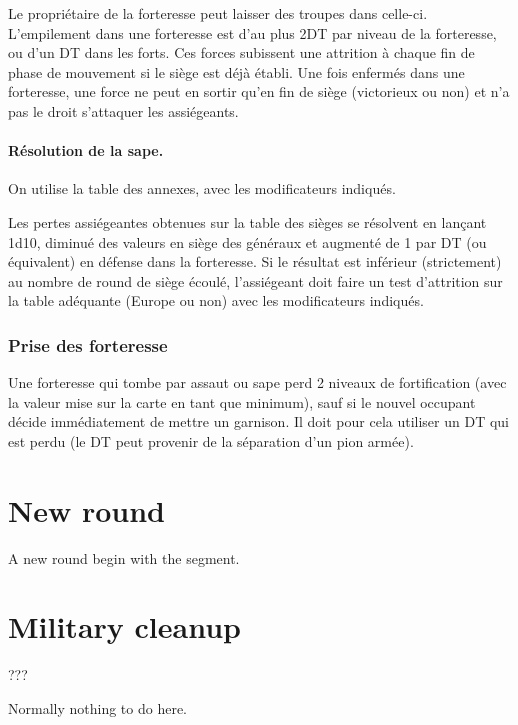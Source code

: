 Le propriétaire de la forteresse peut laisser des troupes dans celle-ci.
L'empilement dans une forteresse est d'au plus 2DT par niveau de la
forteresse, ou d'un DT dans les forts. Ces forces subissent une attrition
à chaque fin de phase de mouvement si le siège est déjà
établi. Une fois enfermés dans une forteresse, une force ne peut
en sortir qu'en fin de siège (victorieux ou non) et n'a pas le
droit s'attaquer les assiégeants.

\paragraph{Résolution de la sape.} On utilise la table des annexes,
avec les modificateurs indiqués.

Les pertes assiégeantes obtenues sur la table des sièges se résolvent
en lançant 1d10, diminué des valeurs en siège des généraux
et augmenté de 1 par DT (ou équivalent) en défense dans la forteresse.
Si le résultat est inférieur (strictement) au nombre de round
de siège écoulé, l'assiégeant doit faire un test d'attrition sur la table
adéquante (Europe ou non) avec les modificateurs indiqués.

\subsubsection{Prise des forteresse}
Une forteresse qui tombe par assaut ou sape perd 2 niveaux de
fortification (avec la valeur mise sur la carte en tant que minimum),
sauf si le nouvel occupant décide immédiatement de mettre un
garnison. Il doit pour cela utiliser un DT qui est perdu (le DT peut
provenir de la séparation d'un pion armée).



\section{New round}
A new round begin with the  segment.

\section{Military cleanup}
???

Normally nothing to do here.

